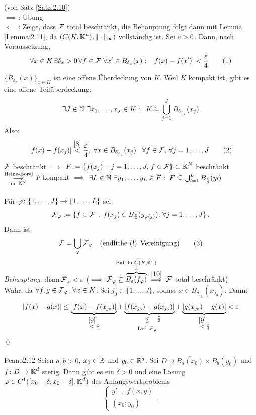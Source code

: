 \documentclass[a4paper]{article}
\begin{document}
\begin{Beweis}
(von Satz \ref{Satz:2.10})\\
\glqq{}$\implies$\grqq{}: Übung\\
\glqq{}$\impliedby$\grqq{}: Zeige, dass $\operatorname{\mathcal{F}}$ total beschränkt, die Behauptung folgt dann mit Lemma \ref{Lemma:2.11}, da $(C(K,\operatorname{\mathbb K}^n),\|\cdot\|_{\infty})$ vollständig ist. Sei $\operatorname{\varepsilon}>0$. Dann, nach Voraussetzung, 
\[
\forall x\in K\,\exists \delta_x>0\,\forall f\in\operatorname{\mathcal{F}}\,\forall x'\in B_{\delta_x}(x):\;\;|f(x)-f(x')|<\frac{\operatorname{\varepsilon}}{4}\tag{$1$}\label{8}
\]
$\{B_{\delta_x}(x)\}_{x\in K}$ ist eine offene Überdeckung von $K$. Weil $K$ kompakt ist, gibt es eine offene Teilüberdeckung:
\[\exists J\in\operatorname{\mathbb N}\,\exists x_1,\ldots,x_J\in K:\;\;K\subseteq \bigcup_{j=1}^JB_{\delta_{x_j}}(x_j)\]
Also:
\[|f(x)-f(x_j)|\overset{\eqref{8}}{<}\frac{\operatorname{\varepsilon}}{4},\;\forall x\in B_{\delta_{x_j}}(x_j)\;\;\;\forall f\in\operatorname{\mathcal{F}},\,\forall j=1,\ldots,J\tag{$2$}\label{9}\]
$\operatorname{\mathcal{F}}$ beschränkt $\implies$ $F:=\{f(x_j)\,:\,j=1,\ldots, J,\,f\in\operatorname{\mathcal{F}}\}\subset \operatorname{\mathbb K}^N$ beschränkt $\overset{\text{Heine-Borel}}{\underset{\text{in }\operatorname{\mathbb K}^N}{\implies}}$ $\overline{F}$ kompakt $\implies$ $\exists L\in\operatorname{\mathbb N}\,\exists y_1,\ldots,y_L\in \overline F:\; F\subseteq \bigcup_{l=1}^LB_{\frac{\operatorname{\varepsilon} }{4}}(y_l)$\\
\ \\
Für $\operatorname{\varphi}\colon \{1,\ldots,J\}\to\{1,\ldots,L\}$ sei
\[\operatorname{\mathcal{F}}_{\operatorname{\varphi}}:=\{f\in\operatorname{\mathcal{F}}\,:\,f(x_j)\in B_{\frac{\operatorname{\varepsilon} }{4}}(y_{\operatorname{\varphi}(j)}),\,\forall j=1,\ldots,J\}\,.\]
Dann ist
\[
\operatorname{\mathcal{F}}=\bigcup_{\operatorname{\varphi}}\operatorname{\mathcal{F}}_{\operatorname{\varphi}}\;\;\;\text{(endliche (!) Vereinigung)}\tag{$3$}\label{10}
\]
\textit{Behauptung}: $\operatorname{\mathrm{diam}} \operatorname{\mathcal{F}}_{\operatorname{\varphi}}<\operatorname{\varepsilon}$ ($\implies \FF_{\vp}\subseteq \overbrace{B_{\ve}(f_{\vp})}^{\mathclap{\substack{\text{Ball in }C(K,\KK^n)\\\downarrow}}}\overset{\eqref{10}}{\implies} \FF$ total beschränkt)\\
Wahr, da $\forall f,g\in\operatorname{\mathcal{F}}_{\operatorname{\varphi}},\,\forall x\in K$: Sei $j_0\in \{1,\ldots,J\}$, sodass $x\in B_{\delta_{x_{j_0}}}(x_{j_0})$. Dann:
\[|f(x)-g(x)|\le \underbrace{|f(x)-f(x_{j_0})|}_{\overset{\eqref{9}}{<}\frac{\operatorname{\varepsilon} }{4}}
+\underbrace{|f(x_{j_0})-g(x_{j_0})|}_{\underset{\substack{\uparrow\\\text{Def }\operatorname{\mathcal{F}}_{\operatorname{\varphi}}}}{<}\frac{\operatorname{\varepsilon} }{2}}
+\underbrace{|g(x_{j_0})-g(x)|}_{\overset{\eqref{9}}{<}\frac{\operatorname{\varepsilon} }{4}}<\operatorname{\varepsilon}
\]\qed
\end{Beweis}

\begin{Satz}{Peano}{2.12}
Seien $a,b>0$, $x_0\in\mathbb R$ und $y_0\in\mathbb R^d$. Sei $D\supseteq \overline{B_a(x_0)}\times \overline{B_b(y_0)}$ und $f\colon D\to\operatorname{\mathbb K}^d$ stetig. Dann gibt es ein $\delta>0$ und eine Lösung $\operatorname{\varphi}\in C^1([x_0-\delta,x_0+\delta],\operatorname{\mathbb K}^d)$ des Anfangswertproblems 
\[\left\{ \begin{array}{l}
y'=f(x,y)\\
(x_0;y_0)
\end{array}\right.\,. \]
\end{Satz}
\end{document}
